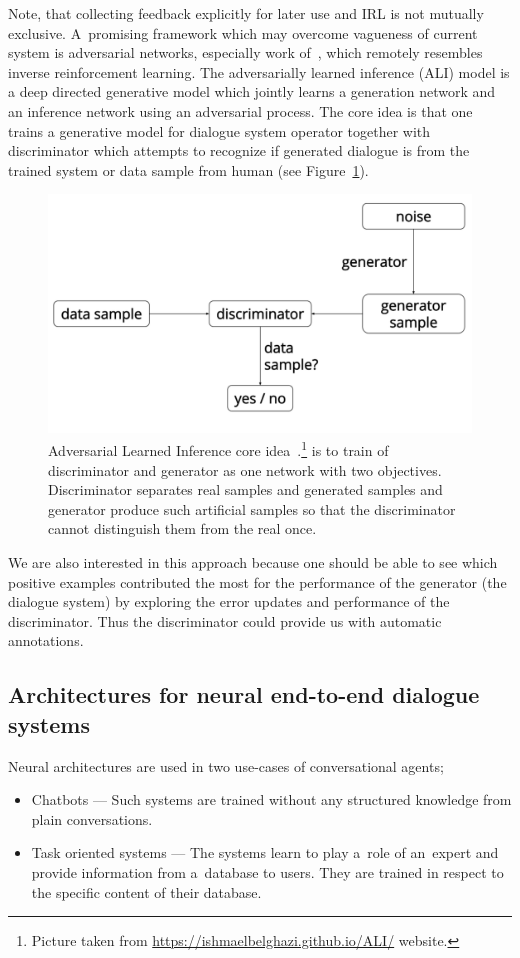 \documentclass[11pt]{article}
\begin{document}
Note, that collecting feedback explicitly for later use and IRL is not mutually exclusive.
A~promising framework which may overcome vagueness of current system is adversarial networks, especially work of~\cite{dumoulin_adversarially_2016}, which remotely resembles inverse reinforcement learning.
The adversarially learned inference (ALI) model is a deep directed generative model which jointly learns a generation network and an inference network using an adversarial process. 
The core idea is that one trains a generative model for dialogue system operator together with discriminator which attempts to recognize if generated dialogue is from the trained system or data sample from human (see Figure~\ref{fig:gan}).

\begin{figure}[htpb]
    \centering
    \includegraphics[width=0.8\linewidth]{gan_simple}
    \caption{Adversarial Learned Inference core idea~\cite{dumoulin_adversarially_2016}.\footnote{Picture taken from \url{https://ishmaelbelghazi.github.io/ALI/} website.} is to train of discriminator and generator as one network with two objectives. Discriminator separates real samples and generated samples and generator produce such artificial samples so that the discriminator cannot distinguish them from the real once.}
\label{fig:gan}
\end{figure}

We are also interested in this approach because one should be able to see which positive examples contributed the most for the performance of the generator (the dialogue system) by exploring the error updates and performance of the discriminator.
Thus the discriminator could provide us with automatic annotations. 

\subsection{Architectures for neural end-to-end dialogue systems}
\label{sub:nn_architectures}
Neural architectures are used in two use-cases of conversational agents;
\begin{itemize}
    \item Chatbots --- Such systems are trained without any structured knowledge from plain conversations.
    \item Task oriented systems --- The systems learn to play a~role of an~expert and provide information from a~database to users.
        They are trained in respect to the specific content of their database.
\end{itemize}
\end{document}
